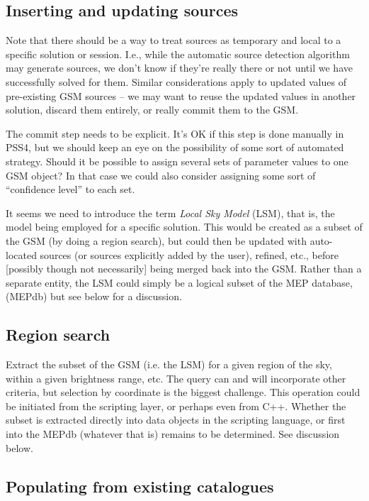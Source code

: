 \documentclass[10pt]{article}
\begin{document}
  \subsection{Inserting and updating sources}

Note that there should be a way to treat sources as temporary and local to a
specific solution or session. I.e., while the automatic source detection
algorithm may generate sources, we don't know if they're really there or not
until we have successfully solved for them. Similar considerations apply to
updated values of pre-existing GSM sources -- we may want to reuse the updated
values in another solution, discard them entirely, or really commit them to the
GSM.

The commit step needs to be explicit. It's OK if this step is done manually in
PSS4, but we should keep an eye on the possibility of some sort of automated
strategy. Should it be possible to assign several sets of parameter
values to one GSM object? In that case we could also consider assigning some
sort of ``confidence level'' to each set.

It seems we need to introduce the term {\em Local Sky Model} (LSM), that is,
the model being employed for a specific solution. This would be created as a
subset of the GSM (by doing a region search), but could then be updated with
auto-located sources (or sources explicitly added by the user), refined, etc.,
before [possibly though not necessarily] being merged back into the GSM. Rather
than a separate entity, the LSM could simply be a logical subset of the MEP
database, (MEPdb) but see below for a discussion.

  \subsection{Region search}
  
Extract the subset of the GSM (i.e. the LSM) for a given region of the sky,
within a given brightness range, etc. The query can and will incorporate other
criteria, but selection by coordinate is the biggest challenge. This operation
could be initiated from the scripting layer, or perhaps even from C++. Whether
the subset is extracted directly into data objects in the scripting language,
or first into the MEPdb (whatever that is) remains to be determined. See
discussion below.

  \subsection{Populating from existing catalogues}
  
\end{document}
